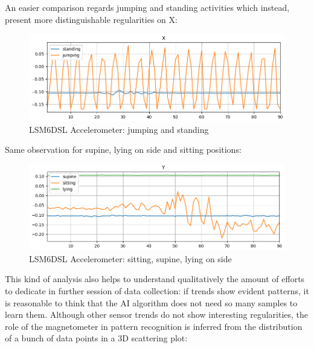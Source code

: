 An easier comparison regards jumping and standing activities which instead, present more distinguishable regularities on X:
\begin{figure}[H]
		\hfill\includegraphics[scale=0.8]{figures/plot_ACC_LSM6DSL_DS_standing_jumping_X.png}\hspace*{\fill}
		\caption{LSM6DSL Accelerometer: jumping and standing}\label{fig:6}
		\centering
\end{figure} 
Same observation for supine, lying on side and sitting positions:
\begin{figure}[H]
	\hfill\includegraphics[scale=0.8]{figures/plot_ACC_LSM303AGR_DS_supine_sitting_lying_Y.png}\hspace*{\fill}
	\caption{LSM6DSL Accelerometer: sitting, supine, lying on side}\label{fig:7}
	\centering
\end{figure} 
This kind of analysis also helps to understand qualitatively the amount of efforts to dedicate in further session of data collection: if trends show evident patterns, it is reasonable to think that the AI algorithm does not need so many samples to learn them. Although other sensor trends do not show interesting regularities, the role of the magnetometer in pattern recognition is inferred from the distribution of a bunch of data points in a 3D scattering plot:
